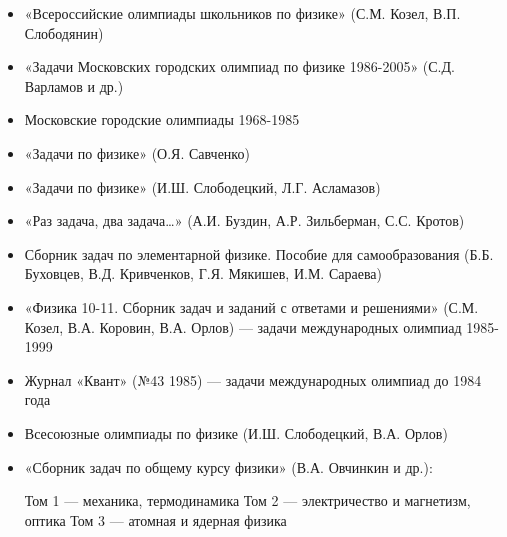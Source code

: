 \begin{itemize}

\item «Всероссийские олимпиады школьников по физике» (С.М. Козел, В.П. Слободянин)

\item «Задачи Московских городских олимпиад по физике 1986-2005» (С.Д. Варламов и др.)

\item Московские городские олимпиады 1968-1985

\item «Задачи по физике» (О.Я. Савченко)

\item «Задачи по физике» (И.Ш. Слободецкий, Л.Г. Асламазов)

\item «Раз задача, два задача…» (А.И. Буздин, А.Р. Зильберман, С.С. Кротов)

\item Сборник задач по элементарной физике. Пособие для самообразования (Б.Б. Буховцев, В.Д. Кривченков, Г.Я. Мякишев, И.М. Сараева)

\item «Физика 10-11. Сборник задач и заданий с ответами и решениями» (С.М. Козел, В.А. Коровин, В.А. Орлов) — задачи международных олимпиад 1985-1999

\item Журнал «Квант» (№43 1985) — задачи международных олимпиад до 1984 года

\item Всесоюзные олимпиады по физике (И.Ш. Слободецкий, В.А. Орлов)

\item «Сборник задач по общему курсу физики» (В.А. Овчинкин и др.):

Том 1 — механика, термодинамика
Том 2 — электричество и магнетизм, оптика
Том 3 — атомная и ядерная физика
\end{itemize}